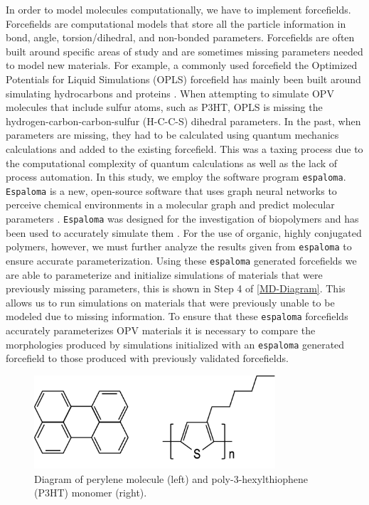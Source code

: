 \par In order to model molecules computationally, we have to implement forcefields. Forcefields are computational models that store all the particle information in bond, angle, torsion/dihedral, and non-bonded parameters. Forcefields are often built around specific areas of study and are sometimes missing parameters needed to model new materials. For example, a commonly used forcefield the Optimized Potentials for Liquid Simulations (OPLS) forcefield has mainly been built around simulating hydrocarbons and proteins \citep{opls,ghahremanpour_refinement_2022}. When attempting to simulate OPV molecules that include sulfur atoms, such as P3HT, OPLS is missing the hydrogen-carbon-carbon-sulfur (H-C-C-S) dihedral parameters. In the past, when parameters are missing, they had to be calculated using quantum mechanics calculations and added to the existing forcefield. This was a taxing process due to the computational complexity of quantum calculations as well as the lack of process automation. In this study, we employ the software program \texttt{espaloma}. \texttt{Espaloma} is a new, open-source software that uses graph neural networks to perceive chemical environments in a molecular graph and predict molecular parameters \citep{wang_end--end_2022}. \texttt{Espaloma} was designed for the investigation of biopolymers and has been used to accurately simulate them \citep{shirts2023, takaba_machine-learned_2024}.  For the use of organic, highly conjugated polymers, however, we must further analyze the results given from \texttt{espaloma} to ensure accurate parameterization. Using these \texttt{espaloma} generated forcefields we are able to parameterize and initialize simulations of materials that were previously missing parameters, this is shown in Step 4 of \autoref{MD-Diagram}. This allows us to run simulations on materials that were previously unable to be modeled due to missing information. To ensure that these \texttt{espaloma} forcefields accurately parameterizes OPV materials it is necessary to compare the morphologies produced by simulations initialized with an \texttt{espaloma} generated forcefield to those produced with previously validated forcefields. 
\begin{figure}[hbt!]
    \centering
    \includegraphics[width=0.8\textwidth]{src/figures/FF_figs/P3HTandPerylene.png} %
    \caption{Diagram of perylene molecule (left) and poly-3-hexylthiophene (P3HT) monomer (right).}
    \label{per_p3ht_fig}
\end{figure}
